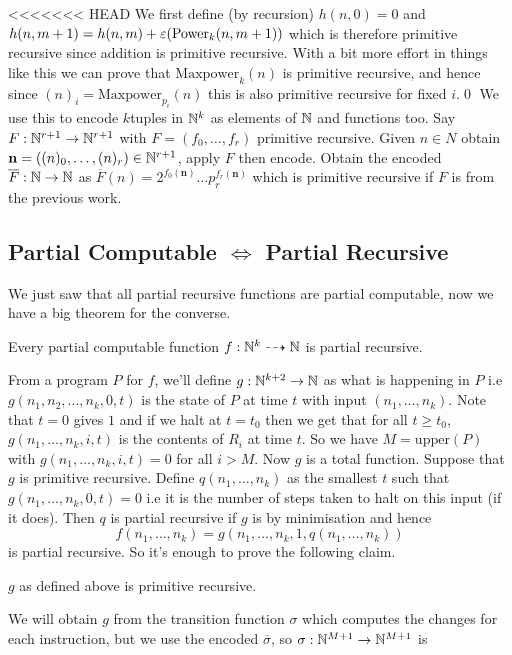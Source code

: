 \documentclass[tikx, border = 10pt]{article}
\begin{document}
<<<<<<< HEAD
We first define (by recursion) $ h(n,0) = 0 $ and $ h(n,m+1) = h(n,m) + \varepsilon(\mathrm{Power}_k(n,m+1)) $ which is therefore primitive recursive since addition is primitive recursive. With a bit more effort in things like this we can prove that $ \mathrm{Maxpower}_k(n) $ is primitive recursive, and hence since $ (n)_i = \mathrm{Maxpower}_{p_i}(n) $ this is also primitive recursive for fixed $ i $.\qed
We use this to encode $ k $tuples in $ \mathbb{N}^k $ as elements of $ \mathbb{N} $ and functions too. Say $ F: \mathbb{N}^{r+1} \to \mathbb{N}^{r+1} $ with $ F = (f_0,\dots, f_r) $ primitive recursive. Given $ n\in N $ obtain $ \mathbf n = ((n)_0,\dots, (n)_r)\in \mathbb{N}^{r+1} $, apply $ F $ then encode. Obtain the encoded $ \overline F: \mathbb{N} \to \mathbb{N} $ as $ \overline F(n) = 2^{f_0(\mathbf n)}\dots p_r^{f_r(\mathbf n)} $ which is primitive recursive if $ F $ is from the previous work.
\subsection{Partial Computable $ \iff $ Partial Recursive}
We just saw that all partial recursive functions are partial computable, now we have a big theorem for the converse.
\begin{theorem}
  Every partial computable function $ f: \mathbb{N}^k \dashrightarrow \mathbb{N} $ is partial recursive.
\end{theorem}
\pf From a program $ P $ for $ f $, we'll define $ g: \mathbb{N}^{k+2} \to \mathbb{N} $ as what is happening in $ P $ i.e $ g(n_1, n_2,\dots, n_k, 0,t) $ is the state of $ P $ at time $ t $ with input $ (n_1,\dots, n_k) $. Note that $ t=0 $ gives $ 1 $ and if we halt at $ t=t_0 $ then we get that for all $ t\ge t_0 $, $ g(n_1,\dots, n_k,i,t) $ is the contents of $ R_i $ at time $ t $. So we have $ M = \mathrm{upper}(P) $ with $ g(n_1,\dots, n_k,i,t) = 0 $ for all $ i>M $. Now $ g $ is a total function. Suppose that $ g $ is primitive recursive. Define $ q(n_1,\dots, n_k) $ as the smallest $ t $ such that $ g(n_1,\dots, n_k,0,t) = 0 $ i.e it is the number of steps taken to halt on this input (if it does). Then $ q $ is partial recursive if $ g $ is by minimisation and hence 
\[
  f(n_1,\dots, n_k) = g(n_1,\dots, n_k,1,q(n_1,\dots, n_k))
\]
is partial recursive. So it's enough to prove the following claim.
\begin{claim}
  $ g $ as defined above is primitive recursive.
\end{claim}
\pf We will obtain $ g $ from the transition function $ \sigma $ which computes the changes for each instruction, but we use the encoded $ \overline \sigma $, so $ \sigma: \mathbb{N}^{M+1} \to \mathbb{N}^{M+1} $ is 
\end{document}
